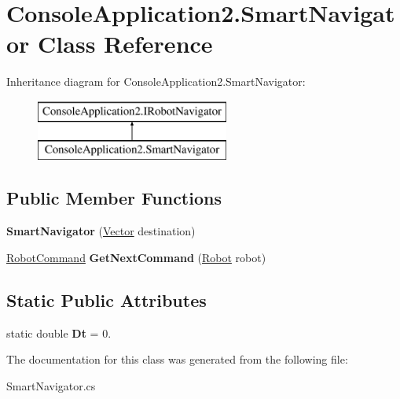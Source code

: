 \hypertarget{class_console_application2_1_1_smart_navigator}{}\section{Console\+Application2.\+Smart\+Navigator Class Reference}
\label{class_console_application2_1_1_smart_navigator}
Inheritance diagram for Console\+Application2.\+Smart\+Navigator\+:\begin{figure}[H]
\begin{center}
\leavevmode
\includegraphics[height=2.000000cm]{class_console_application2_1_1_smart_navigator}
\end{center}
\end{figure}
\subsection*{Public Member Functions}
\begin{DoxyCompactItemize}
\item 
\hypertarget{class_console_application2_1_1_smart_navigator_a9289dd8078b83d28f05de4e942abfae9}{}{\bfseries Smart\+Navigator} (\hyperlink{class_console_application2_1_1_vector}{Vector} destination)\label{class_console_application2_1_1_smart_navigator_a9289dd8078b83d28f05de4e942abfae9}

\item 
\hypertarget{class_console_application2_1_1_smart_navigator_ace757b081a06bdf64cf5ddd7f7e35370}{}\hyperlink{class_console_application2_1_1_robot_command}{Robot\+Command} {\bfseries Get\+Next\+Command} (\hyperlink{class_console_application2_1_1_robot}{Robot} robot)\label{class_console_application2_1_1_smart_navigator_ace757b081a06bdf64cf5ddd7f7e35370}

\end{DoxyCompactItemize}
\subsection*{Static Public Attributes}
\begin{DoxyCompactItemize}
\item 
\hypertarget{class_console_application2_1_1_smart_navigator_af8f0dd2ced3547845bf93c6cb0f44b0c}{}static double {\bfseries Dt} = 0.\label{class_console_application2_1_1_smart_navigator_af8f0dd2ced3547845bf93c6cb0f44b0c}

\end{DoxyCompactItemize}


The documentation for this class was generated from the following file\+:\begin{DoxyCompactItemize}
\item 
Smart\+Navigator.\+cs\end{DoxyCompactItemize}
